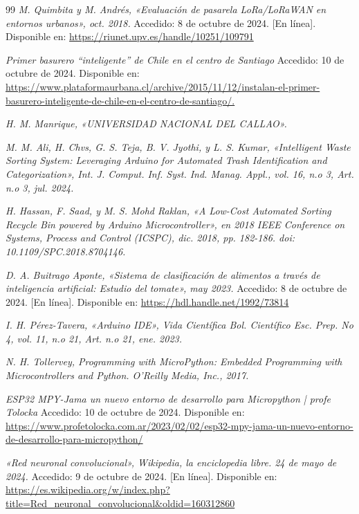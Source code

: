 \begin{thebibliography}{99}
    \textit{M. Quimbita y M. Andrés, «Evaluación de pasarela LoRa/LoRaWAN en entornos urbanos», oct. 2018.} Accedido: 8 de octubre de 2024. [En línea]. Disponible en: \url{https://riunet.upv.es/handle/10251/109791}

    \textit{Primer basurero “inteligente” de Chile en el centro de Santiago} Accedido: 10 de octubre de 2024. Disponible en: \url{https://www.plataformaurbana.cl/archive/2015/11/12/instalan-el-primer-basurero-inteligente-de-chile-en-el-centro-de-santiago/.}
    
    \textit{H. M. Manrique, «UNIVERSIDAD NACIONAL DEL CALLAO».}
    
    \textit{M. M. Ali, H. Chvs, G. S. Teja, B. V. Jyothi, y L. S. Kumar, «Intelligent Waste Sorting System: Leveraging Arduino for Automated Trash Identification and Categorization», Int. J. Comput. Inf. Syst. Ind. Manag. Appl., vol. 16, n.o 3, Art. n.o 3, jul. 2024.}
    
    \textit{H. Hassan, F. Saad, y M. S. Mohd Raklan, «A Low-Cost Automated Sorting Recycle Bin powered by Arduino Microcontroller», en 2018 IEEE Conference on Systems, Process and Control (ICSPC), dic. 2018, pp. 182-186. doi: 10.1109/SPC.2018.8704146.}
    
    \textit{D. A. Buitrago Aponte, «Sistema de clasificación de alimentos a través de inteligencia artificial: Estudio del tomate», may 2023.} Accedido: 8 de octubre de 2024. [En línea]. Disponible en: \url{https://hdl.handle.net/1992/73814}
    
    \textit{I. H. Pérez-Tavera, «Arduino IDE», Vida Científica Bol. Científico Esc. Prep. No 4, vol. 11, n.o 21, Art. n.o 21, ene. 2023.}
    
    \textit{N. H. Tollervey, Programming with MicroPython: Embedded Programming with Microcontrollers and Python. O’Reilly Media, Inc., 2017.}

    \textit{ESP32 MPY-Jama un nuevo entorno de desarrollo para Micropython | profe Tolocka} Accedido: 10 de octubre de 2024. Disponible en: \url{https://www.profetolocka.com.ar/2023/02/02/esp32-mpy-jama-un-nuevo-entorno-de-desarrollo-para-micropython/}
    
    \textit{«Red neuronal convolucional», Wikipedia, la enciclopedia libre. 24 de mayo de 2024.} Accedido: 9 de octubre de 2024. [En línea]. Disponible en: \url{https://es.wikipedia.org/w/index.php?title=Red_neuronal_convolucional&oldid=160312860}
    

\end{thebibliography}
